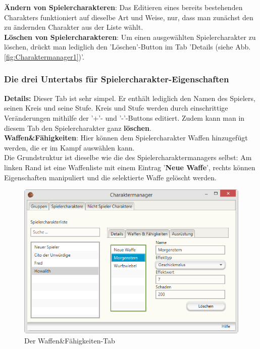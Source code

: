 \documentclass[11pt, a4paper, german]{article}
\begin{document}
\textbf{Ändern von Spielercharakteren}: Das Editieren eines bereits bestehenden Charakters funktioniert auf dieselbe Art und Weise, nur, dass man zunächst den zu ändernden Charakter aus der Liste wählt.\\

\textbf{Löschen von Spielercharakteren}: Um einen ausgewählten Spielercharakter zu löschen, drückt man lediglich den 'Löschen'-Button im Tab 'Details (siehe Abb. \ref{fig:Charaktermanager1})'.


\subsubsection{Die drei Untertabs für Spielercharakter-Eigenschaften}
\textbf{Details:} Dieser Tab ist sehr simpel. Er enthält lediglich den Namen des Spielers, seinen Kreis und seine Stufe. Kreis und Stufe werden durch einschrittige Veränderungen mithilfe der '+'- und '-'-Buttons editiert. Zudem kann man in diesem Tab den Spielercharakter ganz \textbf{löschen}.\\

\textbf{Waffen\&Fähigkeiten}: Hier können dem Spielercharakter Waffen hinzugefügt werden, die er im Kampf auswählen kann. \\
Die Grundstruktur ist dieselbe wie die des Spielercharaktermanagers selbst: Am linken Rand ist eine Waffenliste mit einem Eintrag '\textbf{Neue Waffe}', rechts können Eigenschaften manipuliert und die selektierte Waffe gelöscht werden.
\begin{figure}[h]
\centering
\includegraphics[width=1\linewidth]{Bilder/Charaktermanager_Spieler1}
\caption{Der Waffen\&Fähigkeiten-Tab}
\label{fig:Charaktermanager_Spieler1}
\end{figure}
\end{document}
